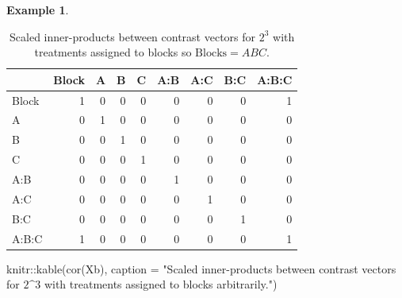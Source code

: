 \documentclass[
]{book}
\newenvironment{Shaded}{\begin{snugshade}}{\end{snugshade}}
\newcommand{\AttributeTok}[1]{\textcolor[rgb]{0.77,0.63,0.00}{#1}}
\newcommand{\FunctionTok}[1]{\textcolor[rgb]{0.00,0.00,0.00}{#1}}
\newcommand{\NormalTok}[1]{#1}
\newcommand{\SpecialCharTok}[1]{\textcolor[rgb]{0.00,0.00,0.00}{#1}}
\newcommand{\StringTok}[1]{\textcolor[rgb]{0.31,0.60,0.02}{#1}}
\theoremstyle{definition}
\theoremstyle{definition}
\newtheorem{example}{Example}[chapter]
\theoremstyle{definition}
\theoremstyle{definition}
\theoremstyle{remark}
\begin{document}
\begin{example}
\begin{Shaded}
\end{Shaded}

\begin{table}

\caption{\label{tab:cor-optimal}Scaled inner-products between contrast vectors for $2^3$ with treatments assigned to blocks so $\mathrm{Blocks} = ABC$.}
\centering
\begin{tabular}[t]{l|r|r|r|r|r|r|r|r}
\hline
  & Block & A & B & C & A:B & A:C & B:C & A:B:C\\
\hline
Block & 1 & 0 & 0 & 0 & 0 & 0 & 0 & 1\\
\hline
A & 0 & 1 & 0 & 0 & 0 & 0 & 0 & 0\\
\hline
B & 0 & 0 & 1 & 0 & 0 & 0 & 0 & 0\\
\hline
C & 0 & 0 & 0 & 1 & 0 & 0 & 0 & 0\\
\hline
A:B & 0 & 0 & 0 & 0 & 1 & 0 & 0 & 0\\
\hline
A:C & 0 & 0 & 0 & 0 & 0 & 1 & 0 & 0\\
\hline
B:C & 0 & 0 & 0 & 0 & 0 & 0 & 1 & 0\\
\hline
A:B:C & 1 & 0 & 0 & 0 & 0 & 0 & 0 & 1\\
\hline
\end{tabular}
\end{table}

\begin{Shaded}
\begin{Highlighting}[]
\NormalTok{knitr}\SpecialCharTok{::}\FunctionTok{kable}\NormalTok{(}\FunctionTok{cor}\NormalTok{(Xb), }\AttributeTok{caption =} \StringTok{"Scaled inner{-}products between contrast vectors for $2\^{}3$ with treatments assigned to blocks arbitrarily."}\NormalTok{)}
\end{Highlighting}
\end{Shaded}

\begin{table}


\end{table}
\end{example}
\end{document}
